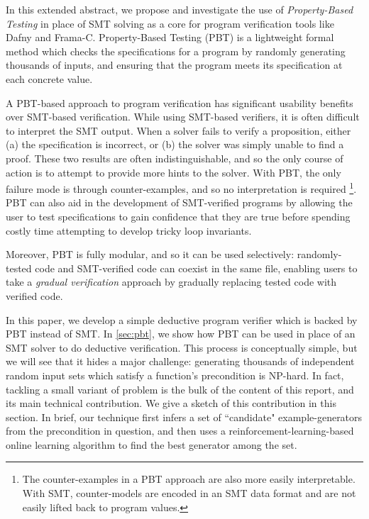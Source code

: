 \documentclass[sigconf,nonacm]{acmart}
\begin{document}
In this extended abstract, we propose and investigate the use of \textit{Property-Based Testing} in
place of SMT solving as a core for program verification tools like Dafny and Frama-C.
Property-Based Testing (PBT) \cite{qc} is a lightweight formal method which checks the
specifications for a program by randomly generating thousands of
inputs, and ensuring that the program meets its specification at each concrete value.

A PBT-based approach to program verification has significant usability benefits
over SMT-based verification. While using SMT-based verifiers, it is often difficult
to interpret the SMT output. When a solver fails to verify a proposition,
either (a) the specification is incorrect, or
(b) the solver was simply unable to find a proof. These two results are often
indistinguishable, and so the only course of action is
to attempt to provide more hints to the solver. With PBT, the only failure mode is through
counter-examples, and so no interpretation is required \footnote{
The counter-examples in a PBT approach are also more easily interpretable. With SMT,
counter-models are encoded in an SMT data format and are not easily lifted
back to program values.
}. PBT can also aid in
the development of SMT-verified programs by allowing the user to test
specifications to gain confidence that they are true before spending costly time
attempting to develop tricky loop invariants.

Moreover, PBT is fully modular, and so it can be used selectively:
randomly-tested code and SMT-verified code can coexist in the same file,
enabling users to take a \textit{gradual verification} approach by gradually
replacing tested code with verified code.

In this paper, we develop a simple deductive program verifier
which is backed by PBT instead of SMT. In \autoref{sec:pbt}, we show how PBT can
be used in place of an SMT solver to do deductive verification. This process is
conceptually simple, but we will see that it hides a major challenge: generating
thousands of independent random input sets which satisfy a function's
precondition is NP-hard. In fact, tackling a small variant of problem is the
bulk of the content of this report, and its main technical contribution. We give
a sketch of this contribution in this section. In brief, our technique first
infers a set of ``candidate" example-generators from the precondition in
question, and then uses a reinforcement-learning-based online learning algorithm
to find the best generator among the set.
\end{document}
